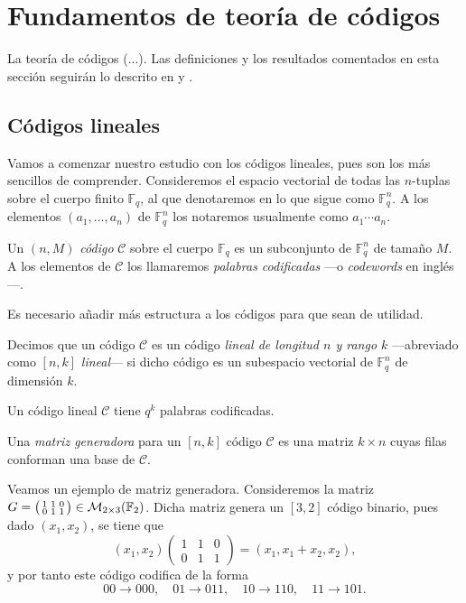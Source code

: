 \chapter{Fundamentos de teoría de códigos}

La teoría de códigos (...). Las definiciones y los resultados comentados en esta sección seguirán lo descrito en \parencite[1-48]{huffman_fundamentals_2003} y \parencite{podesta_introduccion_2006}.

\section{Códigos lineales}

Vamos a comenzar nuestro estudio con los códigos lineales, pues son los más sencillos de comprender. Consideremos el espacio vectorial de todas las \(n\)-tuplas sobre el cuerpo finito \(\mathbb F_q\), al que denotaremos en lo que sigue como \(\mathbb F_q^n\). A los elementos \((a_1, \dots, a_n)\) de \(\mathbb F_q^n\) los notaremos usualmente como \(a_1\!\cdots a_n\).

\begin{definition}
  Un \((n, M)\) \textit{código} \(\mathcal C\) sobre el cuerpo \(\mathbb F_q\) es un subconjunto de \(\mathbb F_q^n\) de tamaño \(M\). A los elementos de \(\mathcal C\) los llamaremos \textit{palabras codificadas} —o \textit{codewords} en inglés—.
\end{definition}

Es necesario añadir más estructura a los códigos para que sean de utilidad.

\begin{definition}
  Decimos que un código \(\mathcal C\) es un código \textit{lineal de longitud \(n\) y rango \(k\)} —abreviado como \([n, k]\) \textit{lineal}— si dicho código es un subespacio vectorial de \(\mathbb F_q^n\) de dimensión \(k\).
\end{definition}

Un código lineal \(\mathcal C\) tiene \(q^k\) palabras codificadas.

\begin{definition}
  Una \textit{matriz generadora} para un \([n, k]\) código \(\mathcal C\) es una matriz \(k \times n\) cuyas filas conforman una base de \(\mathcal C\).
\end{definition}

Veamos un ejemplo de matriz generadora. Consideremos la matriz \(G = \begin{psmallmatrix}
  1 & 1 & 0 \\ 0 & 1 & 1
\end{psmallmatrix} \in \mathcal M_{2 \times 3}(\mathbb F_2)\). Dicha matriz genera un \([3, 2]\) código binario, pues dado \((x_1, x_2)\), se tiene que \[(x_1, x_2) \begin{pmatrix}
  1 & 1 & 0 \\ 0 & 1 & 1
\end{pmatrix} = (x_1, x_1 + x_2, x_2),\] y por tanto este código codifica de la forma \[00 \to 000, \quad 01 \to 011,\quad 10 \to 110,\quad 11 \to 101.\]

